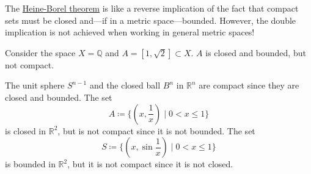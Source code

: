   The \hyperref[thm:heine-borel-theorem]{Heine-Borel theorem} is like a reverse implication of the fact that compact sets must be closed and---if in a metric space---bounded. However, the double implication is not achieved when working in general metric spaces!

  \begin{example}
    \label{ex:closed-and-bounded-in-metric-space-but-not}
    Consider the space $X = \mathbb{Q}$ and $A = [1, \sqrt{2}] \subset X$. $A$ is closed and bounded, but not compact. 
  \end{example}

  \begin{example}
    \label{ex:the-sphere-and-closed-ball-are-compact}
    The unit sphere $S^{n-1}$ and the closed ball $B^n$ in $\mathbb{R}^n$ are compact since they are closed and bounded. The set
    \begin{equation}
      A \coloneqq \{(x, \frac{1}{x}) \; | \; 0 < x \leq 1\}
    \end{equation}
    is closed in $\mathbb{R}^2$, but is not compact since it is not bounded. The set 
    \begin{equation}
      S \coloneqq \{(x, \sin{\frac{1}{x}}) \; | \; 0<x\leq 1\}
    \end{equation}
    is bounded in $\mathbb{R}^2$, but it is not compact since it is not closed. 
  \end{example}

